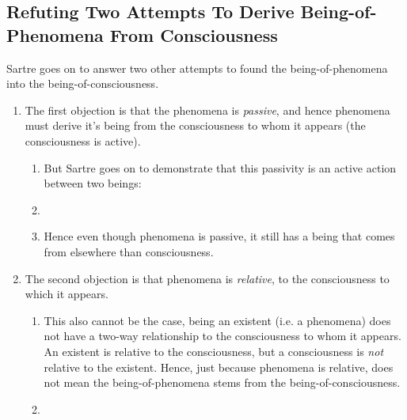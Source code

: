 \subsection{Refuting Two Attempts To Derive Being-of-Phenomena From Consciousness}
Sartre goes on to answer two other attempts to found the being-of-phenomena into the being-of-consciousness.
\begin{enumerate}
  \item The first objection is that the phenomena is \emph{passive}, and hence phenomena must derive it's being from the consciousness to whom it appears (the consciousness is active).
  \begin{enumerate}
    \item But Sartre goes on to demonstrate that this passivity is an active action between two beings:
    \item {}
    \item Hence even though phenomena is passive, it still has a being that comes from elsewhere than consciousness.
  \end{enumerate}
  \item The second objection is that phenomena is \emph{relative}, to the consciousness to which it appears. 
  \begin{enumerate}
    \item This also cannot be the case, being an existent (i.e. a phenomena) does not have a two-way relationship to the consciousness to whom it appears. An existent is relative to the consciousness, but a consciousness is \emph{not} relative to the existent. Hence, just because phenomena is relative, does not mean the being-of-phenomena stems from the being-of-consciousness.
    \item {}
  \end{enumerate}
\end{enumerate}


